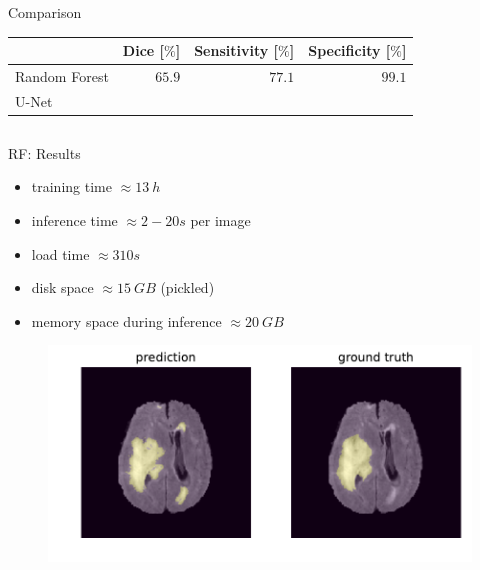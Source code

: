 \documentclass[final]{beamer}
\newlength{\onecolwid}
\newlength{\twocolwid}
\begin{document}
\begin{frame}[t]
\begin{columns}[t]
\begin{column}{\twocolwid}
\begin{alertblock}{Comparison}
\centering
	\begin{tabular}{lrrr}
	\toprule
	 & Dice [$\%$] & Sensitivity [$\%$] & Specificity [$\%$] \\
	\midrule
	Random Forest & $65.9$ & $77.1$ & $99.1$ \\
	U-Net & & & \\
	\bottomrule
	\end{tabular}
\end{alertblock}


\begin{columns}[t,totalwidth=\twocolwid] %

\begin{column}{\onecolwid} %

\begin{block}{RF: Results}
\begin{itemize}[label={}]
\item training time $\approx \SI{13}{h}$
\item inference time $\approx \si{2-20}{s}$ per image
\item load time $\approx \si{310}{s}$
\item disk space $\approx \SI{15}{GB}$ (pickled)
\item memory space during inference $\approx \SI{20}{GB}$
\end{itemize}
\begin{figure}
\centering
\includegraphics[width=0.9\linewidth]{rf_prediction_84}
\end{figure}
\end{block}



\end{column}
\end{columns}
\end{column}
\end{columns}
\end{frame}
\end{document}
